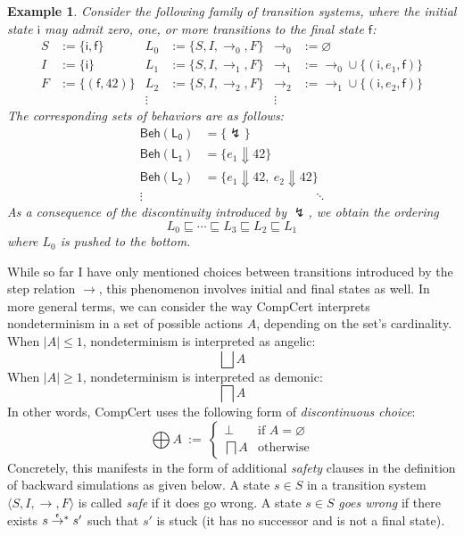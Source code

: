 \documentclass[11pt,oneside,draft]{book}
\newtheorem{example}[theorem]{Example}
\theoremstyle{definition}
\newcommand{\kw}[1]{\ensuremath{ \mathsf{#1} }}
\newcommand{\refby}{\sqsubseteq} %
\begin{document}
\begin{example} %
Consider the following family of transition systems,
where the initial state $\kw{i}$ may admit zero, one, or more
transitions to the final state $\kw{f}$:
\begin{align*}
  S &:= \{ \kw{i}, \kw{f} \} &
  L_0 &:= \{ S, I, {\rightarrow_0}, F \} &
  {\rightarrow_0} &:= \varnothing \\
  I &:= \{ \kw{i} \} &
  L_1 &:= \{ S, I, {\rightarrow_1}, F \} &
  {\rightarrow_1} &:= {\rightarrow_0} \cup
    \{ (\kw{i}, e_1, \kw{f}) \} \\
  F &:= \{ (\kw{f}, 42) \} &
  L_2 &:= \{ S, I, {\rightarrow_2}, F \} &
  {\rightarrow_2} &:= {\rightarrow_1} \cup
    \{ (\kw{i}, e_2, \kw{f}) \} \\
  & & \vdots \: & & \vdots \:\:
\end{align*}
The corresponding sets of behaviors are as follows:
\begin{align*}
  \kw{Beh(L_0)} &= \{ \lightning \} \\
  \kw{Beh(L_1)} &= \{ e_1 \Downarrow 42 \} \\
  \kw{Beh(L_2)} &= \{ e_1 \Downarrow 42, \: e_2 \Downarrow 42 \} \\
  \vdots \quad & \hspace{9em} \ddots
\end{align*}
As a consequence of the discontinuity introduced by $\lightning$,
we obtain the ordering
\[
  L_0 \refby \cdots \refby L_3 \refby L_2 \refby L_1
\]
where $L_0$ is pushed to the bottom.
\end{example}

While so far I have only mentioned
choices between transitions
introduced by the step relation $\rightarrow$,
this phenomenon involves initial and final states as well.
In more general terms,
we can consider the way CompCert interprets nondeterminism
in a set of possible actions $A$,
depending on the set's cardinality.
When $|A| \le 1$, nondeterminism is interpreted as angelic:
\[
  \bigsqcup A
\]
When $|A| \ge 1$, nondeterminism is interpreted as demonic:
\[
  \bigsqcap A
\]
In other words, CompCert uses the following form of
\emph{discontinuous choice}:
\[
  \bigoplus A \: := \:
  \begin{cases}
    \bot & \mbox{if } A = \varnothing \\
    \bigsqcap A & \mbox{otherwise}
  \end{cases}
\]
Concretely, this manifests in the form of additional
\emph{safety} clauses
in the definition of backward simulations
as given below.
A state $s \in S$
in a transition system $\langle S, I, {\rightarrow}, F \rangle$
is called \emph{safe}
if it does go wrong.
A state $s \in S$
\emph{goes wrong} if there exists
$s \mathrel{\smash{\stackrel{\epsilon}{\rightarrow}}^*} s'$
such that $s'$ is stuck
(it has no successor and is not a final state).
\end{document}
